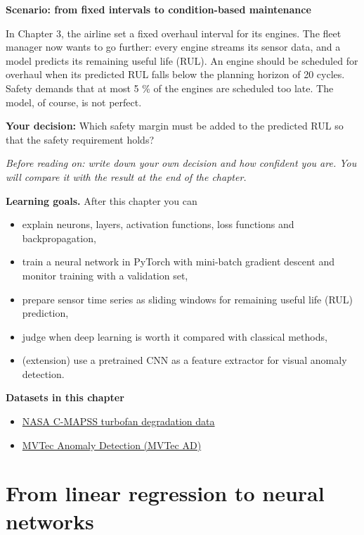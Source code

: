 \documentclass[
  letterpaper,
  DIV=11,
  numbers=noendperiod]{scrreprt}
\providecommand{\tightlist}{%
  \setlength{\itemsep}{0pt}\setlength{\parskip}{0pt}}\usepackage{longtable,booktabs,array}
\begin{document}
\textbf{Scenario: from fixed intervals to condition-based maintenance}

In Chapter 3, the airline set a fixed overhaul interval for its engines.
The fleet manager now wants to go further: every engine streams its
sensor data, and a model predicts its remaining useful life (RUL). An
engine should be scheduled for overhaul when its predicted RUL falls
below the planning horizon of 20 cycles. Safety demands that at most 5
\% of the engines are scheduled too late. The model, of course, is not
perfect.

\textbf{Your decision:} Which safety margin must be added to the
predicted RUL so that the safety requirement holds?

\emph{Before reading on: write down your own decision and how confident
you are. You will compare it with the result at the end of the chapter.}

\textbf{Learning goals.} After this chapter you can

\begin{itemize}
\tightlist
\item
  explain neurons, layers, activation functions, loss functions and
  backpropagation,
\item
  train a neural network in PyTorch with mini-batch gradient descent and
  monitor training with a validation set,
\item
  prepare sensor time series as sliding windows for remaining useful
  life (RUL) prediction,
\item
  judge when deep learning is worth it compared with classical methods,
\item
  (extension) use a pretrained CNN as a feature extractor for visual
  anomaly detection.
\end{itemize}

\textbf{Datasets in this chapter}

\begin{itemize}
\tightlist
\item
  \href{https://data.nasa.gov/dataset/cmapss-jet-engine-simulated-data}{NASA
  C-MAPSS turbofan degradation data}
\item
  \href{https://www.mvtec.com/company/research/datasets/mvtec-ad}{MVTec
  Anomaly Detection (MVTec AD)}
\end{itemize}

\section{From linear regression to neural
networks}\label{from-linear-regression-to-neural-networks}
\end{document}

